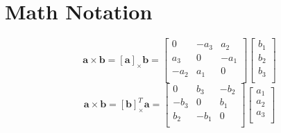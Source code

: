 %
%
%

\chapter{Math Notation}\label{app:MathNotation}
\[
  \mathbf{a} \times  \mathbf{b}= \left[\mathbf{a}\right] _{\times} \mathbf{b}= \begin{bmatrix}
    0 & -a_3 & a_2 \\
    a_3 & 0 & -a_1 \\
    -a_2 & a_1     & 0     \\
  \end{bmatrix}
  \begin{bmatrix}
    b_1 \\
    b_2\\
    b_3\\
  \end{bmatrix}
\]
\[
  \mathbf{a} \times  \mathbf{b}= \left[\mathbf{b}\right]_{\times}^{T} \mathbf{a}= \begin{bmatrix}
    0 & b_3 & -b_2 \\
    -b_3 & 0 & b_1 \\
    b_2 & -b_1     & 0     \\
  \end{bmatrix}
  \begin{bmatrix}
    a_1 \\
    a_2\\
    a_3\\
  \end{bmatrix}
\]
